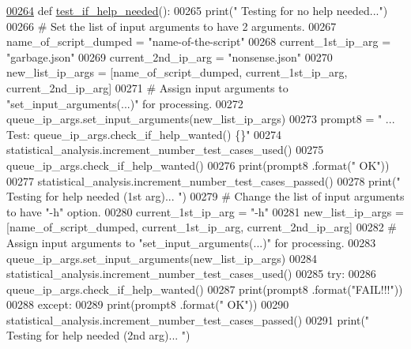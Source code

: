 \begin{DoxyCode}
\hypertarget{classutilities_1_1queue__ip__arguments__tester_1_1queue__ip__args__tester_l00264}{}\hyperlink{classutilities_1_1queue__ip__arguments__tester_1_1queue__ip__args__tester_a4af9d2177916d79d95fc9de5531162af}{00264}     \textcolor{keyword}{def }\hyperlink{classutilities_1_1queue__ip__arguments__tester_1_1queue__ip__args__tester_a4af9d2177916d79d95fc9de5531162af}{test\_if\_help\_needed}():
00265         print(\textcolor{stringliteral}{" Testing for no help needed..."})
00266         \textcolor{comment}{#   Set the list of input arguments to have 2 arguments.}
00267         name\_of\_script\_dumped = \textcolor{stringliteral}{"name-of-the-script"}
00268         current\_1st\_ip\_arg = \textcolor{stringliteral}{"garbage.json"}
00269         current\_2nd\_ip\_arg = \textcolor{stringliteral}{"nonsense.json"}
00270         new\_list\_ip\_args = [name\_of\_script\_dumped, current\_1st\_ip\_arg, current\_2nd\_ip\_arg]
00271         \textcolor{comment}{#   Assign input arguments to "set\_input\_arguments(...)" for processing.}
00272         queue\_ip\_args.set\_input\_arguments(new\_list\_ip\_args)
00273         prompt8 = \textcolor{stringliteral}{" ... Test: queue\_ip\_args.check\_if\_help\_wanted()  \{\}"}
00274         statistical\_analysis.increment\_number\_test\_cases\_used()
00275         queue\_ip\_args.check\_if\_help\_wanted()
00276         print(prompt8 .format(\textcolor{stringliteral}{" OK"}))
00277         statistical\_analysis.increment\_number\_test\_cases\_passed()
00278         print(\textcolor{stringliteral}{" Testing for help needed (1st arg)... "})
00279         \textcolor{comment}{#   Change the list of input arguments to have "-h" option.}
00280         current\_1st\_ip\_arg = \textcolor{stringliteral}{"-h"}
00281         new\_list\_ip\_args = [name\_of\_script\_dumped, current\_1st\_ip\_arg, current\_2nd\_ip\_arg]
00282         \textcolor{comment}{#   Assign input arguments to "set\_input\_arguments(...)" for processing.}
00283         queue\_ip\_args.set\_input\_arguments(new\_list\_ip\_args)
00284         statistical\_analysis.increment\_number\_test\_cases\_used()
00285         \textcolor{keywordflow}{try}:
00286             queue\_ip\_args.check\_if\_help\_wanted()
00287             print(prompt8 .format(\textcolor{stringliteral}{"FAIL!!!"}))
00288         \textcolor{keywordflow}{except}:
00289             print(prompt8 .format(\textcolor{stringliteral}{" OK"}))
00290             statistical\_analysis.increment\_number\_test\_cases\_passed()
00291         print(\textcolor{stringliteral}{" Testing for help needed (2nd arg)... "})

\end{DoxyCode}
